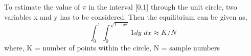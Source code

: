\noindent To estimate the value of $\pi$ in the interval [0,1] through the unit circle, two variables x and y has to be considered. Then the equilibrium can be given as, \\
$$\int_{0}^{1} \int_{0}^{\sqrt{1-x^2}}1 \textit{dy dx} \approx K/N $$
\noindent where, K = number of points within the circle, N = sample numbers